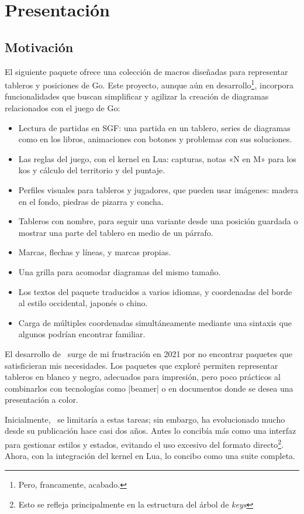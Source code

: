 \section{Presentación}

\subsection{Motivaci\'on}

El siguiente paquete ofrece una colección de macros diseñadas para representar tableros y posiciones de Go. Este proyecto, aunque aún en desarrollo\footnote{Pero, francamente, acabado.}, incorpora funcionalidades que buscan simplificar y agilizar la creación de diagramas relacionados con el juego de Go:
\begin{itemize}
	\item Lectura de partidas en SGF: una partida en un tablero, series de diagramas como en los libros, animaciones con botones y problemas con sus soluciones.
	\item Las reglas del juego, con el kernel en Lua: capturas, notas «N en M» para los kos y cálculo del territorio y del puntaje.
	\item Perfiles visuales para tableros y jugadores, que pueden usar imágenes: madera en el fondo, piedras de pizarra y concha.
	\item Tableros con nombre, para seguir una variante desde una posición guardada o mostrar una parte del tablero en medio de un párrafo.
	\item Marcas, flechas y líneas, y marcas propias.
	\item Una grilla para acomodar diagramas del mismo tamaño.
	\item Los textos del paquete traducidos a varios idiomas, y coordenadas del borde al estilo occidental, japonés o chino.
	\item Carga de múltiples coordenadas simultáneamente mediante una sintaxis que algunos podrían encontrar familiar.
\end{itemize}

El desarrollo de \pgfgoname\ surge de mi frustración en 2021 por no encontrar paquetes que satisficieran mis necesidades. Los paquetes que exploré permiten representar tableros en blanco y negro, adecuados para impresión, pero poco prácticos al combinarlos con tecnolog\'ias como |beamer| o en documentos donde se desea una presentación a color.

Inicialmente, \pgfgoname\ se limitaría a estas tareas; sin embargo, ha evolucionado mucho desde su publicación hace casi dos a\~nos. Antes lo concib\'ia más como una interfaz para gestionar estilos y estados, evitando el uso excesivo del formato directo\footnote{Esto se refleja principalmente en la estructura del árbol de \emph{keys}}. Ahora, con la integraci\'on del kernel en Lua, lo concibo como una suite completa.

